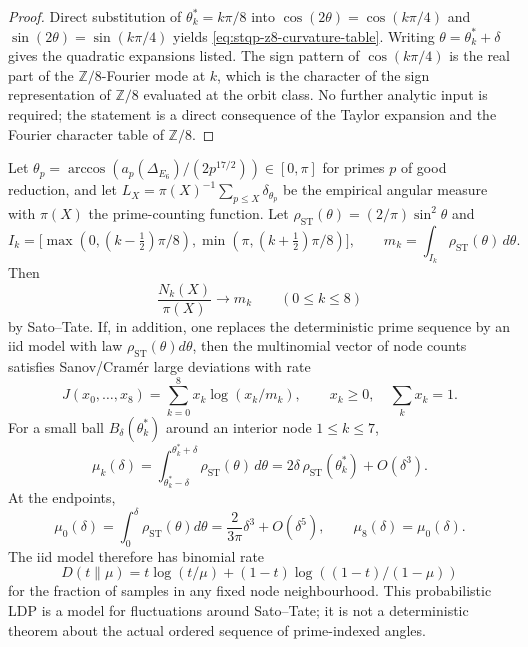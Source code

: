 \begin{proof}
Direct substitution of $\theta^*_k = k\pi/8$ into $\cos(2\theta) =
\cos(k\pi/4)$ and $\sin(2\theta) = \sin(k\pi/4)$ yields
\eqref{eq:stqp-z8-curvature-table}. Writing
$\theta=\theta_k^*+\delta$ gives the quadratic expansions listed.
The sign pattern of
$\cos(k\pi/4)$ is the real part of the $\mathbb Z/8$-Fourier mode
at $k$, which is the character of the sign representation of
$\mathbb Z/8$ evaluated at the orbit class. No further analytic
input is required; the statement is a direct consequence of the
Taylor expansion and the Fourier character table of $\mathbb Z/8$.
\end{proof}

\begin{theorem}
\label{thm:stqp-fricke-z8-ldp}
%
%
%
Let $\theta_p = \arccos(a_p(\Delta_{E_6})/(2p^{17/2})) \in [0,\pi]$
for primes $p$ of good reduction, and let $L_X = \pi(X)^{-1}
\sum_{p \le X} \delta_{\theta_p}$ be the empirical angular measure
with $\pi(X)$ the prime-counting function.
Let $\rho_{\mathrm{ST}}(\theta)=(2/\pi)\sin^2\theta$ and
\[
I_k=\bigl[\max(0,(k-\tfrac12)\pi/8),
\min(\pi,(k+\tfrac12)\pi/8)\bigr],\qquad
m_k=\int_{I_k}\rho_{\mathrm{ST}}(\theta)\,d\theta.
\]
Then
\[
\frac{N_k(X)}{\pi(X)}\longrightarrow m_k
\qquad (0\le k\le8)
\]
by Sato--Tate. If, in addition, one replaces the deterministic prime
sequence by an iid model with law $\rho_{\mathrm{ST}}(\theta)d\theta$,
then the multinomial vector of node counts satisfies Sanov/Cramér
large deviations with rate
\begin{equation}
\label{eq:stqp-ldp-global-rate}
J(x_0,\ldots,x_8)=
\sum_{k=0}^{8} x_k\log(x_k/m_k),
\qquad
x_k\ge0,\quad \sum_kx_k=1.
\end{equation}
For a small ball $B_\delta(\theta_k^*)$ around an interior node
$1\le k\le7$,
\[
\mu_k(\delta)=
\int_{\theta_k^*-\delta}^{\theta_k^*+\delta}
\rho_{\mathrm{ST}}(\theta)\,d\theta
=2\delta\,\rho_{\mathrm{ST}}(\theta_k^*)+O(\delta^3).
\]
At the endpoints,
\begin{equation}
\label{eq:stqp-ldp-cusp}
\mu_0(\delta)=
\int_0^\delta \rho_{\mathrm{ST}}(\theta)d\theta
=\frac{2}{3\pi}\delta^3+O(\delta^5),
\qquad
\mu_8(\delta)=\mu_0(\delta).
\end{equation}
The iid model therefore has binomial rate
\[
D(t\|\mu)=
t\log(t/\mu)+(1-t)\log((1-t)/(1-\mu))
\]
for the fraction of samples in any fixed node neighbourhood. This
probabilistic LDP is a model for fluctuations around Sato--Tate; it
is not a deterministic theorem about the actual ordered sequence of
prime-indexed angles.
\end{theorem}

